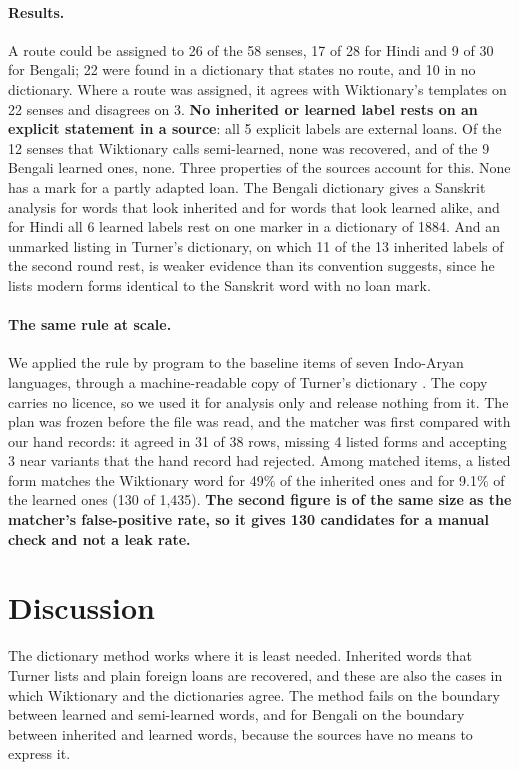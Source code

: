 \documentclass[11pt]{article}
\begin{document}
\paragraph{Results.} A route could be assigned to 26 of the 58 senses, 17 of 28 for Hindi and 9 of 30 for Bengali; 22 were found in a dictionary that states no route, and 10 in no dictionary. Where a route was assigned, it agrees with Wiktionary's templates on 22 senses and disagrees on 3. \textbf{No inherited or learned label rests on an explicit statement in a source}: all 5 explicit labels are external loans. Of the 12 senses that Wiktionary calls semi-learned, none was recovered, and of the 9 Bengali learned ones, none. Three properties of the sources account for this. None has a mark for a partly adapted loan. The Bengali dictionary gives a Sanskrit analysis for words that look inherited and for words that look learned alike, and for Hindi all 6 learned labels rest on one marker in a dictionary of 1884. And an unmarked listing in Turner's dictionary, on which 11 of the 13 inherited labels of the second round rest, is weaker evidence than its convention suggests, since he lists modern forms identical to the Sanskrit word with no loan mark.


\paragraph{The same rule at scale.} We applied the rule by program to the baseline items of seven Indo-Aryan languages, through a machine-readable copy of Turner's dictionary \citep{arora2023jambu}. The copy carries no licence, so we used it for analysis only and release nothing from it. The plan was frozen before the file was read, and the matcher was first compared with our hand records: it agreed in 31 of 38 rows, missing 4 listed forms and accepting 3 near variants that the hand record had rejected. Among matched items, a listed form matches the Wiktionary word for 49\% of the inherited ones and for 9.1\% of the learned ones (130 of 1,435). \textbf{The second figure is of the same size as the matcher's false-positive rate, so it gives 130 candidates for a manual check and not a leak rate.}

\section{Discussion}

The dictionary method works where it is least needed. Inherited words that Turner lists and plain foreign loans are recovered, and these are also the cases in which Wiktionary and the dictionaries agree. The method fails on the boundary between learned and semi-learned words, and for Bengali on the boundary between inherited and learned words, because the sources have no means to express it.
\end{document}
